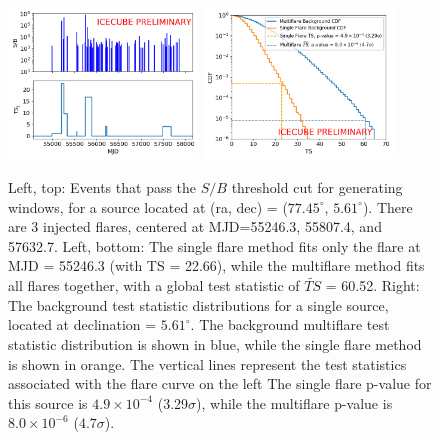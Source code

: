 \begin{figure}[h]
\centering
\includegraphics[width=0.45\textwidth]{figs/example_flarecurve.png}
\includegraphics[width=0.45\textwidth]{figs/1src_1k_bgdist.png}
\caption{Left, top: Events that pass the $S/B$ threshold cut for generating windows, for a source located at (ra, dec) = ($77.45^{\circ}$, $5.61^{\circ}$). There are 3 injected flares, centered at MJD=55246.3, 55807.4, and 57632.7. Left, bottom: The single flare method fits only the flare at MJD = 55246.3 (with TS = 22.66), while the multiflare method fits all flares together, with a global test statistic of $\widetilde{TS}$ = 60.52. Right: The background test statistic distributions for a single source, located at declination = $5.61^{\circ}$. The background multiflare test statistic distribution is shown in blue, while the single flare method is shown in orange. The vertical lines represent the test statistics associated with the flare curve on the left The single flare p-value for this source is $4.9 \times 10^{-4}$ (3.29$\sigma$), while the multiflare p-value is $8.0 \times 10^{-6}$ ($4.7\sigma$). }
\label{fig:mf_example}
\end{figure}


